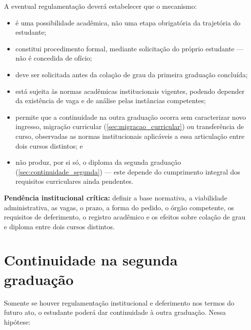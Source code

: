 A eventual regulamentação deverá estabelecer que o mecanismo:

\begin{itemize}
    \item é uma possibilidade acadêmica, não uma etapa obrigatória da trajetória do estudante;
    \item constitui procedimento formal, mediante solicitação do próprio estudante — não é concedida de ofício;
    \item deve ser solicitada antes da colação de grau da primeira graduação concluída;
    \item está sujeita às normas acadêmicas institucionais vigentes, podendo depender da existência de vaga e de análise pelas instâncias competentes;
    \item permite que a continuidade na outra graduação ocorra sem caracterizar novo ingresso, migração curricular (\autoref{sec:migracao_curricular}) ou transferência de curso, observadas as normas institucionais aplicáveis a essa articulação entre dois cursos distintos; e
    \item não produz, por si só, o diploma da segunda graduação (\autoref{sec:continuidade_segunda}) — este depende do cumprimento integral dos requisitos curriculares ainda pendentes.
\end{itemize}

\textbf{Pendência institucional crítica:} definir a base normativa, a viabilidade administrativa, as vagas, o prazo, a forma do pedido, o órgão competente, os requisitos de deferimento, o registro acadêmico e os efeitos sobre colação de grau e diploma entre dois cursos distintos.

\section{Continuidade na segunda graduação}
\label{sec:continuidade_segunda}

Somente se houver regulamentação institucional e deferimento nos termos do futuro ato, o estudante poderá dar continuidade à outra graduação. Nessa hipótese:

